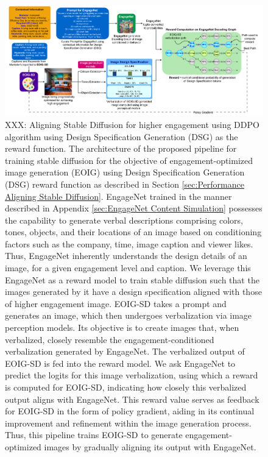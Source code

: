 \begin{landscape}
 \begin{figure}         
         \centering
         \includegraphics[width=1.5\textwidth,scale=1]{images/ddpo_cs_reward_compressed.pdf}
         \caption{\label{fig:architecture_diagram_ddpo_cs_reward}
     XXX: Aligning Stable Diffusion for higher engagement using DDPO algorithm \cite{black2023training} using Design Specification Generation (DSG) as the reward function. The architecture of the proposed pipeline for training stable diffusion for the objective of engagement-optimized image generation (EOIG) using Design Specification Generation (DSG) reward function as described in Section \ref{sec:Performance Aligning Stable Diffusion}. 
     EngageNet trained in the manner described in Appendix \ref{sec:EngageNet Content Simulation} possesses the capability to generate verbal descriptions comprising colors, tones, objects, and their locations of an image based on conditioning factors such as the company, time, image caption and viewer likes. Thus, EngageNet inherently understands the design details of an image, for a given engagement level and caption. 
     We leverage this EngageNet as a reward model to train stable diffusion such that the images generated by it have a design specification aligned with those of higher engagement image. EOIG-SD takes a prompt and generates an image, which then undergoes verbalization via image perception models. Its objective is to create images that, when verbalized, closely resemble the engagement-conditioned verbalization generated by EngageNet. The verbalized output of EOIG-SD is fed into the reward model. We ask EngageNet to predict the logits for this image verbalization, using which a reward is computed for EOIG-SD, indicating how closely this verbalized output aligns with EngageNet. This reward value serves as feedback for EOIG-SD in the form of policy gradient, aiding in its continual improvement and refinement within the image generation process. Thus, this pipeline trains EOIG-SD to generate engagement-optimized images by gradually aligning its output with EngageNet. 
     }
\end{figure}


\end{landscape}


